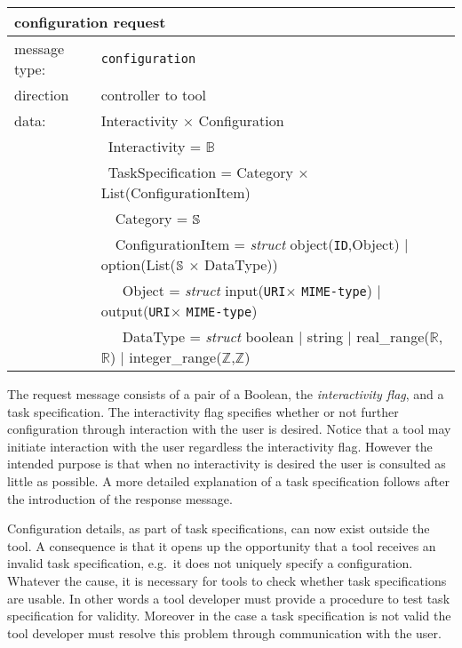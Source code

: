 \documentclass{article}
\newcommand{\msg}[1]{\texttt{#1}}
\newcommand{\String}{\ensuremath \mathbb{S}\xspace}
\newcommand{\Id}{\texttt{ID}\xspace}
\newcommand{\URI}{\texttt{URI}\xspace}
\newcommand{\MIMEtype}{\texttt{MIME-type}\xspace}
\begin{document}
   \begin{table}[H]
    \begin{center}
     \begin{tabular}{|ll|}
      \hline
       \multicolumn{2}{|l|}{\textbf{configuration request}} \\
      \hline
       message type:   & \msg{configuration} \\
      \hline
       direction       & controller to tool \\
      \hline
       data:           & Interactivity $\times$ Configuration \\
                       & \ Interactivity = $\mathbb{B}$ \\
                       & \ TaskSpecification = Category $\times$ List(ConfigurationItem) \\
                       & \ \ Category = $\String$ \\
                       & \ \ ConfigurationItem = \textit{struct} object(\Id,Object) $|$ option(List($\String$ $\times$ DataType)) \\
                       & \ \ \ Object = \textit{struct} input(\URI $\times$ \MIMEtype) $|$ output(\URI $\times$ \MIMEtype) \\
                       & \ \ \ DataType = \textit{struct} boolean $|$ string $|$ real\_range($\mathbb{R}$,$\mathbb{R}$) $|$ integer\_range($\mathbb{Z}$,$\mathbb{Z}$) \\
      \hline
     \end{tabular}
     \vspace{-0.3cm}
    \end{center}
   \end{table}

   \noindent The request message consists of a pair of a Boolean, the
   \textit{interactivity flag}, and a task specification. The interactivity
   flag specifies whether or not further configuration through interaction with
   the user is desired. Notice that a tool may initiate interaction with the
   user regardless the interactivity flag. However the intended purpose is that
   when no interactivity is desired the user is consulted as little as
   possible. A more detailed explanation of a task specification follows after
   the introduction of the response message.

   Configuration details, as part of task specifications, can now exist outside
   the tool.  A consequence is that it opens up the opportunity that a tool
   receives an invalid task specification, e.g.\ it does not uniquely specify a
   configuration. Whatever the cause, it is necessary for tools to check
   whether task specifications are usable.  In other words a tool developer
   must provide a procedure to test task specification for validity. Moreover
   in the case a task specification is not valid the tool developer must
   resolve this problem through communication with the user.
\end{document}
